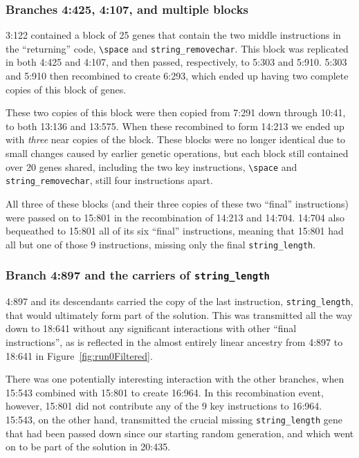 \documentclass[graybox]{svmult}
\begin{document}
\subsubsection{Branches 4:425, 4:107, and multiple blocks}
\label{sec:4:425}

3:122 contained a block of 25 genes %
that contain the two middle instructions in the ``returning''
code, \texttt{\textbackslash space} and \texttt{string\_removechar}.
This block was replicated in both 4:425 and 4:107, and then passed,
respectively, to 5:303 and 5:910. 5:303 and 5:910 then recombined
to create 6:293, which ended up having two complete copies of this
block of genes. %

These two copies of this block were then copied from 7:291 down through 10:41,
to both 13:136 and 13:575. When these recombined to form 14:213
we ended up with \emph{three} near copies of the block. These blocks
were no longer identical due to small changes caused by earlier
genetic operations, but each block still contained over 20 genes shared,
including the two key instructions,
\texttt{\textbackslash space} and \texttt{string\_removechar},
still four instructions apart.

All three of these blocks (and their three copies of these two ``final''
instructions) were passed on to 15:801 in the recombination of 14:213 and
14:704. 14:704 also bequeathed to 15:801 all of its six ``final'' 
instructions, meaning that 15:801 had all but one of those 9
instructions, missing only the final \texttt{string\_length}.

\subsubsection{Branch 4:897 and the carriers of \texttt{string\_length}}
\label{sec:4:897}

4:897 and its descendants carried the copy of the last instruction, 
\texttt{string\_length}, that would ultimately form part of the solution. 
This was transmitted all the way down to
18:641 without any significant interactions with other ``final instructions'',
as is reflected in the almost entirely linear ancestry from 4:897 to 18:641 
in Figure~\ref{fig:run0Filtered}.

There was one potentially interesting interaction with the other branches, 
when 15:543 combined with 15:801 to create 16:964. In this recombination event,
however, 15:801 did not contribute any of the 9 key instructions to 16:964. 
15:543, on the other hand, transmitted the crucial missing 
\texttt{string\_length} gene that had been passed down since our starting 
random generation, and which went on to be part of the solution in 20:435.
\end{document}
